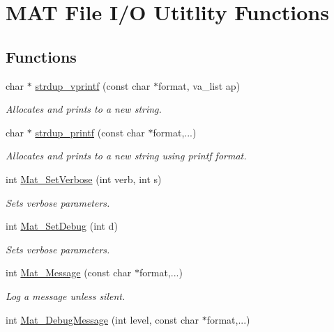 \hypertarget{group__mat__util}{\section{\-M\-A\-T \-File \-I/\-O \-Utitlity \-Functions}
\label{group__mat__util}
}
\subsection*{\-Functions}
\begin{DoxyCompactItemize}
\item 
char $\ast$ \hyperlink{group__mat__util_ga2b342987d3b664345cb233640b611fe9}{strdup\-\_\-vprintf} (const char $\ast$format, va\-\_\-list ap)
\begin{DoxyCompactList}\small\item\em \-Allocates and prints to a new string. \end{DoxyCompactList}\item 
char $\ast$ \hyperlink{group__mat__util_ga291b08f933c75fb70e3736b669896ebd}{strdup\-\_\-printf} (const char $\ast$format,...)
\begin{DoxyCompactList}\small\item\em \-Allocates and prints to a new string using printf format. \end{DoxyCompactList}\item 
int \hyperlink{group__mat__util_gaf348b811ee26bfc923924878cea3c9ba}{\-Mat\-\_\-\-Set\-Verbose} (int verb, int s)
\begin{DoxyCompactList}\small\item\em \-Sets verbose parameters. \end{DoxyCompactList}\item 
int \hyperlink{group__mat__util_gad75e2962dcaf2ac366f2420bb5b13094}{\-Mat\-\_\-\-Set\-Debug} (int d)
\begin{DoxyCompactList}\small\item\em \-Sets verbose parameters. \end{DoxyCompactList}\item 
int \hyperlink{group__mat__util_gae7dfa394b111bc908a616f8f5bddaa97}{\-Mat\-\_\-\-Message} (const char $\ast$format,...)
\begin{DoxyCompactList}\small\item\em \-Log a message unless silent. \end{DoxyCompactList}\item 
int \hyperlink{group__mat__util_ga26e00cfb07551be5201fd9e0f04066d9}{\-Mat\-\_\-\-Debug\-Message} (int level, const char $\ast$format,...)

\end{DoxyCompactItemize}

